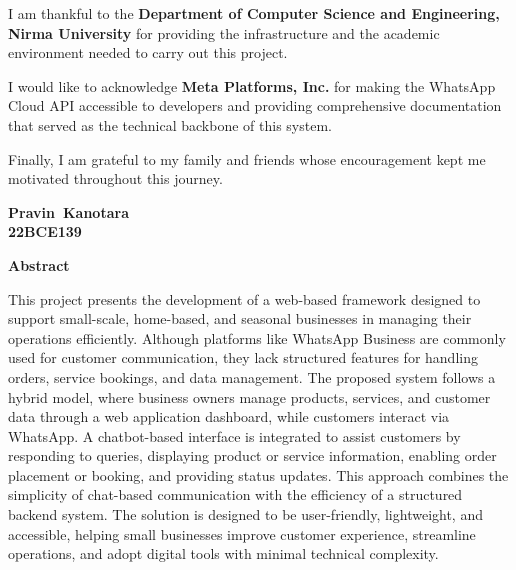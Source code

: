 \documentclass[12pt,a4paper]{report}
\newcommand{\studentname}{Pravin\ Kanotara}
\newcommand{\rollno}{22BCE139}
\newcommand{\university}{Nirma University}
\begin{document}
I am thankful to the \textbf{Department of Computer Science and Engineering, \university} for providing the infrastructure and the academic environment needed to carry out this project.

I would like to acknowledge \textbf{Meta Platforms, Inc.} for making the WhatsApp Cloud API accessible to developers and providing comprehensive documentation that served as the technical backbone of this system.

Finally, I am grateful to my family and friends whose encouragement kept me motivated throughout this journey.

\vspace{1.5cm}
\begin{flushright}
\textbf{\studentname}\\
\textbf{\rollno}\\
\end{flushright}

\newpage
{}
\begin{center}
{\Large\textbf{Abstract}}
\end{center}
\vspace{1em}

This project presents the development of a web-based framework designed to support small-scale, home-based, and seasonal businesses in managing their operations efficiently. Although platforms like WhatsApp Business are commonly used for customer communication, they lack structured features for handling orders, service bookings, and data management.
The proposed system follows a hybrid model, where business owners manage products, services, and customer data through a web application dashboard, while customers interact via WhatsApp. A chatbot-based interface is integrated to assist customers by responding to queries, displaying product or service information, enabling order placement or booking, and providing status updates.
This approach combines the simplicity of chat-based communication with the efficiency of a structured backend system. The solution is designed to be user-friendly, lightweight, and accessible, helping small businesses improve customer experience, streamline operations, and adopt digital tools with minimal technical complexity.

\newpage
\tableofcontents

\newpage
\listoffigures

\newpage
\listoftables
\end{document}

